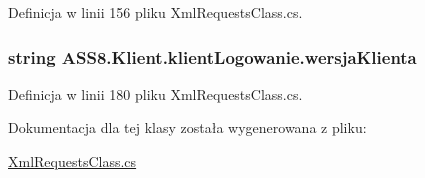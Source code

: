 Definicja w linii 156 pliku XmlRequestsClass.cs.\hypertarget{a00009_aa3348ed5721633094699e4ab4b43289}{
\subsubsection[{wersjaKlienta}]{\setlength{\rightskip}{0pt plus 5cm}string ASS8.Klient.klientLogowanie.wersjaKlienta}}
\label{da/da0/a00009_aa3348ed5721633094699e4ab4b43289}




Definicja w linii 180 pliku XmlRequestsClass.cs.

Dokumentacja dla tej klasy została wygenerowana z pliku:\begin{CompactItemize}
\item 
\hyperlink{a00055}{XmlRequestsClass.cs}\end{CompactItemize}
